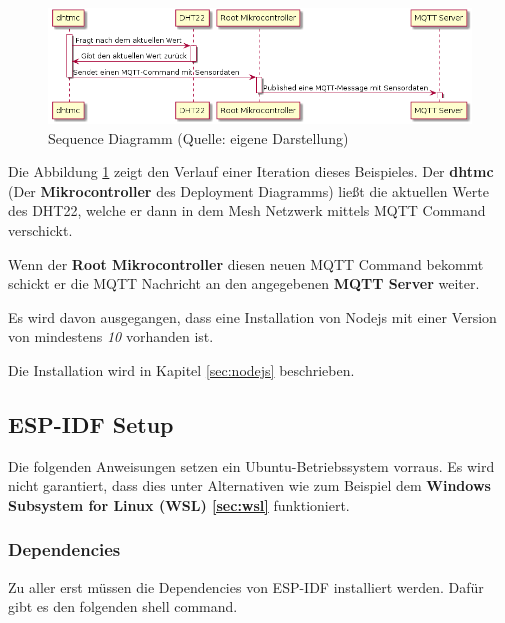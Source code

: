 \vspace*{50px}
\begin{figure}[H]
    \begin{center}
        \includegraphics[scale=.5]{diagrams/mqtt_dht22_example_sequence.png}
        \caption{Sequence Diagramm (Quelle: eigene Darstellung)}
        \label{abb:dht22_sequence_diagram}
    \end{center}
\end{figure}
\vspace*{50px}

Die Abbildung \ref{abb:dht22_sequence_diagram} zeigt den Verlauf einer Iteration dieses Beispieles.
Der \textbf{dhtmc} (Der \textbf{Mikrocontroller} des Deployment Diagramms) ließt die aktuellen Werte des DHT22, welche er dann in dem Mesh Netzwerk mittels MQTT Command verschickt.

Wenn der \textbf{Root Mikrocontroller} diesen neuen MQTT Command bekommt schickt er die MQTT Nachricht an den angegebenen \textbf{MQTT Server} weiter.

Es wird davon ausgegangen, dass eine Installation von Nodejs mit einer Version von mindestens \textit{10} vorhanden ist.

Die Installation wird in Kapitel \ref{sec:nodejs} beschrieben.

\subsection{ESP-IDF Setup}

Die folgenden Anweisungen setzen ein Ubuntu-Betriebssystem vorraus. Es wird nicht garantiert, dass dies unter Alternativen wie zum Beispiel dem \textbf{Windows Subsystem for Linux (WSL) \ref{sec:wsl}} funktioniert. 

\subsubsection{Dependencies}

Zu aller erst müssen die Dependencies von ESP-IDF installiert werden. Dafür gibt es den folgenden shell command.

